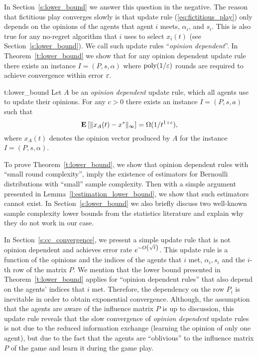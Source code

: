 In Section~\ref{s:lower_bound} we answer this question in the negative.
The reason that fictitious play converges slowly is that
update rule (\ref{eq:fictitious_play})
only depends on the opinions of the agents that agent $i$ meets,
$\alpha_i$, and $s_i$. This is also true for any no-regret algorithm
that $i$ uses to select $x_i(t)$ (see Section~\ref{s:lower_bound}).
We call such update rules \enquote{\emph{opinion dependent}}.
In Theorem~\ref{t:lower_bound} we
show that for any opinion dependent update rule there exists an instance
$I = (P,s,\alpha)$ where $\mathrm{poly}(1/\varepsilon)$ rounds are required to
achieve convergence within error $\varepsilon$.
\begin{reptheorem}{t:lower_bound}
  Let $A$ be an \emph{opinion dependent} update rule, which all
  agents use to update their opinions.
  For any $c>0$ there exists an instance $I=(P,s,a)$ such that
  \[
    \Exp{\norm{\infty}{x_A(t) - x^*}} = \Omega(1/t^{1+c}),
  \]
  where $x_A(t)$ denotes the opinion vector produced by $A$
  for the instance $I=(P,s,\alpha)$.
\end{reptheorem}
%
To prove Theorem~\ref{t:lower_bound}, we show that opinion dependent rules with
\enquote{small round complexity}, imply the existence
of estimators for Bernoulli distributions with
\enquote{small} sample complexity. Then with a simple argument
presented in Lemma~\ref{l:estimation_lower_bound},
we show that such estimators cannot exist.
In Section~\ref{s:lower_bound} we also
briefly discuss two well-known sample complexity lower bounds
from the statistics literature and explain why they do not work in our case.

In Section~\ref{s:cc_convergence}, we present a simple update rule that
is not opinion dependent and  achieves error rate $e^{-O\left(\sqrt{t}\right)}$.
This update rule is a function of the opinions and the indices of the agents
that $i$ met, $\alpha_i,s_i$ and the $i$-th row of the matrix $P$.
We mention that the lower bound presented in Theorem~\ref{t:lower_bound}
applies for \enquote{opinion dependent rules} that also depend on the
agents' indices that $i$ met.  Therefore, the dependency on the row $P_i$ is
inevitable in order to obtain exponential convergence.
Although, the assumption that the agents are aware of the influence matrix
$P$ is up to discussion, this update rule reveals that the slow convergence of
\emph{opinion dependent} update rules is not due to the reduced information exchange
(learning the opinion of only one agent), but due to the fact
that the agents are \enquote{oblivious} to the influence matrix $P$ of the
game and learn it during the game play.

